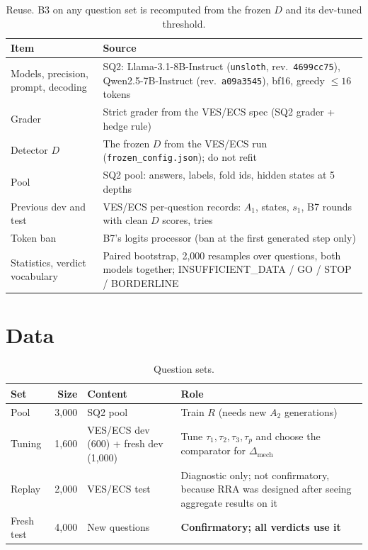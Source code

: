 \documentclass[11pt]{article}
\begin{document}
\begin{table}[H]
\centering
\small
\begin{tabularx}{\textwidth}{@{}lL@{}}
\toprule
Item & Source \\
\midrule
Models, precision, prompt, decoding & SQ2: Llama-3.1-8B-Instruct (\texttt{unsloth}, rev.\ \texttt{4699cc75}),
  Qwen2.5-7B-Instruct (rev.\ \texttt{a09a3545}), bf16, greedy $\le 16$ tokens \\
Grader & Strict grader from the VES/ECS spec (SQ2 grader + hedge rule) \\
Detector $D$ & The frozen $D$ from the VES/ECS run (\texttt{frozen\_config.json}); do not refit \\
Pool & SQ2 pool: answers, labels, fold ids, hidden states at 5 depths \\
Previous dev and test & VES/ECS per-question records: $A_1$, states, $s_1$, B7 rounds with clean $D$ scores,
  tries \\
Token ban & B7's logits processor (ban at the first generated step only) \\
Statistics, verdict vocabulary & Paired bootstrap, 2,000 resamples over questions, both models together;
  INSUFFICIENT\_DATA / GO / STOP / BORDERLINE \\
\bottomrule
\end{tabularx}
\caption{Reuse. B3 on any question set is recomputed from the frozen $D$ and its dev-tuned threshold.}
\end{table}

\section{Data}\label{sec:data}

\begin{table}[H]
\centering
\small
\begin{tabularx}{\textwidth}{@{}lrLL@{}}
\toprule
Set & Size & Content & Role \\
\midrule
Pool & 3,000 & SQ2 pool & Train $R$ (needs new $A_2$ generations) \\
Tuning & 1,600 & VES/ECS dev (600) + fresh dev (1,000) & Tune $\tau_1, \tau_2, \tau_3, \tau_p$ and choose the
  comparator for $\Delta_{\mathrm{mech}}$ \\
Replay & 2,000 & VES/ECS test & Diagnostic only; not confirmatory, because RRA was designed after seeing aggregate
  results on it \\
Fresh test & 4,000 & New questions & \textbf{Confirmatory; all verdicts use it} \\
\bottomrule
\end{tabularx}
\caption{Question sets.}
\end{table}
\end{document}
